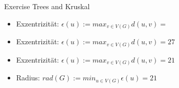 \begin{frame}[allowframebreaks]{Exercise \thesection}{Trees and Kruskal}
\begin{solution}
{\begin{minipage}[t]{20cm}
          \end{minipage}
      }
    \end{solution}
    \begin{exercisenoinc}
      \begin{itemize}
        \item \alert{Exzentrizität:} $\epsilon(u) := max_{v\in V(G)} d(u,v) =$
      \end{itemize}
    \end{exercisenoinc}
    \begin{solutionnoinc}
      \begin{itemize}
        \item \alert{Exzentrizität:} $\epsilon(u) := max_{v\in V(G)} d(u,v) = 27$
      \end{itemize}
    \end{solutionnoinc}
    \begin{solution}
      \begin{itemize}
        \item \alert{Exzentrizität:} $\epsilon(u) := max_{v\in V(G)} d(u,v) = 21$
        \item \alert{Radius:} $rad(G) := min_{u\in V(G)} \epsilon(u) = 21$
      \end{itemize}
    \end{solution}
\end{frame}
